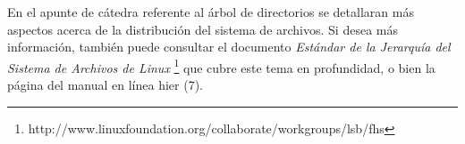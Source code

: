\documentclass[12pt]{article}
\begin{document}
 En el apunte de cátedra referente al árbol de directorios se detallaran más 
aspectos acerca de la distribución del sistema de archivos. Si desea más información,
también puede consultar el documento \textit{Estándar de la Jerarquía del Sistema de Archivos
de Linux} 
\footnote{http://www.linuxfoundation.org/collaborate/workgroups/lsb/fhs}
que cubre este tema en profundidad, o bien la página del manual en línea hier (7).


\end{document}
